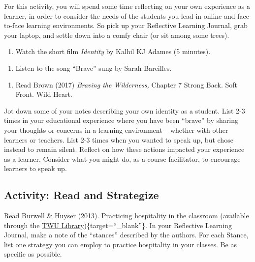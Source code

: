 \documentclass[
]{book}
\providecommand{\tightlist}{%
  \setlength{\itemsep}{0pt}\setlength{\parskip}{0pt}}
\begin{document}
\begin{reflect}
For this activity, you will spend some time reflecting on your own
experience as a learner, in order to consider the needs of the students
you lead in online and face-to-face learning environments. So pick up
your Reflective Learning Journal, grab your laptop, and settle down into
a comfy chair (or sit among some trees).

\begin{enumerate}
\def\labelenumi{\arabic{enumi}.}
\tightlist
\item
  Watch the short film \emph{Identity} by Kalhil KJ Adames (5 minutes).
\end{enumerate}

\begin{enumerate}
\def\labelenumi{\arabic{enumi}.}
\setcounter{enumi}{1}
\tightlist
\item
  Listen to the song ``Brave'' sung by Sarah Bareilles.
\end{enumerate}

\begin{enumerate}
\def\labelenumi{\arabic{enumi}.}
\setcounter{enumi}{2}
\tightlist
\item
  Read Brown (2017) \emph{Braving the Wilderness,} Chapter 7 Strong
  Back. Soft Front. Wild Heart.
\end{enumerate}

Jot down some of your notes describing your own identity as a student.
List 2-3 times in your educational experience where you have been
``brave'' by sharing your thoughts or concerns in a learning environment
-- whether with other learners or teachers. List 2-3 times when you
wanted to speak up, but chose instead to remain silent. Reflect on how
these actions impacted your experience as a learner. Consider what you
might do, as a course facilitator, to encourage learners to speak up.
\end{reflect}

\hypertarget{activity-read-and-strategize}{%
\subsection{Activity: Read and Strategize}\label{activity-read-and-strategize}}

\begin{reflect}
Read Burwell \& Huyser (2013). Practicing hospitality in the classroom
(available through the \href{https://www.twu.ca/library}{TWU
Library})\{target=``\_blank''\}. In your Reflective Learning Journal,
make a note of the ``stances'' described by the authors. For each
Stance, list one strategy you can employ to practice hospitality in your
classes. Be as specific as possible.
\end{reflect}
\end{document}
